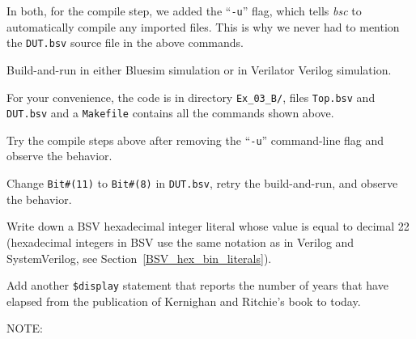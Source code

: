 In both, for the compile step, we added the ``\verb|-u|'' flag, which
tells \emph{bsc} to automatically compile any imported files.  This is
why we never had to mention the \verb|DUT.bsv| source file in the
above commands.

\Beginexercise

\Exercise

Build-and-run in either Bluesim simulation or in Verilator Verilog
simulation.

For your convenience, the code is in directory \verb|Ex_03_B/|, files
\verb|Top.bsv| and \verb|DUT.bsv| and a \verb|Makefile| contains all
the commands shown above.

\Exercise

Try the compile steps above after removing the ``\verb|-u|''
command-line flag and observe the behavior.

\Exercise

Change \verb|Bit#(11)| to \verb|Bit#(8)| in \verb|DUT.bsv|, retry the
build-and-run, and observe the behavior.

\Exercise

Write down a BSV hexadecimal integer literal whose value is equal to
decimal 22 (hexadecimal integers in BSV use the same notation as in
Verilog and SystemVerilog, see Section~\ref{BSV_hex_bin_literals}).

\Exercise

Add another \verb|$display| statement that reports the number of years
that have elapsed from the publication of Kernighan and Ritchie's book
to today.

\Endexercise

\vspace{2ex}

NOTE:


